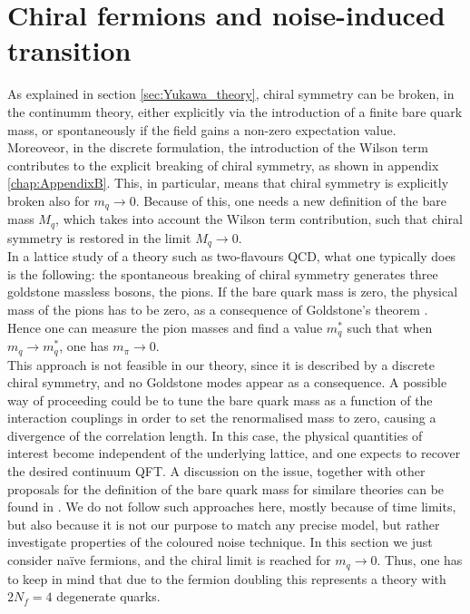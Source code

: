 \section{Chiral fermions and noise-induced transition}
\label{sec:chiral_PT}
As explained in section \ref{sec:Yukawa_theory}, chiral symmetry can be broken, in the continumm theory, either explicitly via the introduction of a finite bare quark mass, or spontaneously if the field gains a non-zero expectation value.\\
Moreoveor, in the discrete formulation, the introduction of the Wilson term contributes to the explicit breaking of chiral symmetry, as shown in appendix \ref{chap:AppendixB}. This, in particular, means that chiral symmetry is explicitly broken also for $m_q \to 0$. Because of this, one needs a new definition of the bare mass $M_q$, which takes into account the Wilson term contribution, such that chiral symmetry is restored in the limit $M_q \to 0$. \\
In a lattice study of a theory such as  two-flavours QCD, what one typically does \cite{rothe_LGT,gattringer_LQCD} is the following: the spontaneous breaking of chiral symmetry generates three goldstone massless bosons, the pions. If the bare quark mass is zero, the physical mass of the pions has to be zero, as a consequence of Goldstone's theorem \cite{goldstone}. Hence one can measure the pion masses and find a value $m_q^*$ such that when $m_q \to m_q^*$, one has $m_\pi \to 0$. \\
This approach is not feasible in our theory, since it is described by a discrete chiral symmetry, and no Goldstone modes appear as a consequence. A possible way of proceeding \cite{Bermudez2018} could be to tune the bare quark mass as a function of the interaction couplings in order to set the renormalised mass to zero, causing a divergence of the correlation length. In this case, the physical quantities of interest become independent of
the underlying lattice, and one expects to recover the desired continuum QFT. A discussion on the issue, together with other proposals for the definition of the bare quark mass for similare theories can be found in \cite{Iwasaki:1994gq,MAIANI1986265}. We do not follow such approaches here, mostly because of time limits, but also because it is not our purpose to match any precise model, but rather investigate properties of the coloured noise technique. In this section we just consider na\"ive fermions, and the chiral limit is reached for $m_q \to 0$. Thus, one has to keep in mind that due to the fermion doubling this represents a theory with $2N_f = 4$ degenerate quarks.
